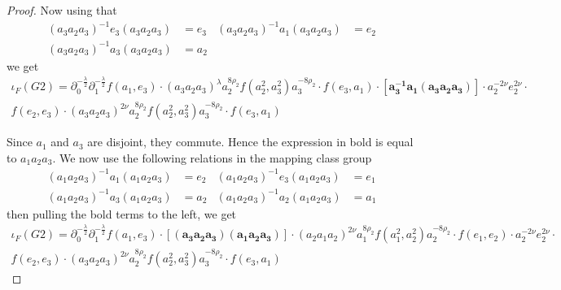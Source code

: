 \documentclass{amsart}
\theoremstyle{definition}
\numberwithin{equation}{section}
\begin{document}
\begin{proof}
Now using that 
    \begin{align*}
        (a_3 a_2 a_3)^{-1}e_3(a_3 a_2 a_3)&= e_3 & (a_3 a_2 a_3)^{-1}a_1(a_3 a_2 a_3)&=e_2\\
        (a_3 a_2 a_3)^{-1}a_3(a_3 a_2 a_3)&= a_2
    \end{align*}
we get
\begin{multline*}
    \iota_{F}(G2)=\partial_0^{-\frac{\lambda}{2}}\partial_1^{-\frac{\lambda}{2}}f(a_1,e_3)\cdot (a_3 a_2 a_3)^{\lambda} a_2^{8\rho_2} f(a_2^2,a_3^2) a_3^{-8\rho_2} \cdot f(e_3,a_1) \cdot \mathbf{[a_3^{-1}a_1(a_3 a_2 a_3)]}\cdot a_2^{-2\nu} e_2^{2\nu} \cdot  \\ f(e_2,e_3) \cdot(a_3 a_2 a_3)^{2\nu} a_2^{8\rho_2} f(a_2^2,a_3^2) a_3^{-8\rho_2}\cdot f(e_3,a_1)
\end{multline*}

Since $a_1$ and $a_3$ are disjoint, they commute. Hence the expression in bold is equal to $a_1a_2a_3$. We now use the following relations in the mapping class group
    \begin{align*}
        (a_1a_2a_3)^{-1} a_1 (a_1a_2a_3)&=e_2 & (a_1a_2a_3)^{-1}e_3(a_1a_2a_3)&= e_1\\
        (a_1a_2a_3)^{-1} a_3 (a_1a_2a_3)&= a_2 & (a_1a_2a_3)^{-1} a_2 (a_1a_2a_3)&= a_1
    \end{align*}
then pulling the bold terms to the left, we get
\begin{multline*}
    \iota_{F}(G2)=\partial_0^{-\frac{\lambda}{2}}\partial_1^{-\frac{\lambda}{2}}f(a_1,e_3)\cdot \mathbf{[(a_3a_2a_3)(a_1 a_2 a_3)]}\cdot(a_2 a_1 a_2)^{2\nu} a_1^{8\rho_2} f(a_1^2,a_2^2) a_2^{-8\rho_2} \cdot f(e_1,e_2) \cdot  a_2^{-2\nu} e_2^{2\nu} \cdot  \\ f(e_2,e_3) \cdot(a_3 a_2 a_3)^{2\nu} a_2^{8\rho_2} f(a_2^2,a_3^2) a_3^{-8\rho_2}\cdot f(e_3,a_1)
\end{multline*}


\end{proof}
\end{document}
